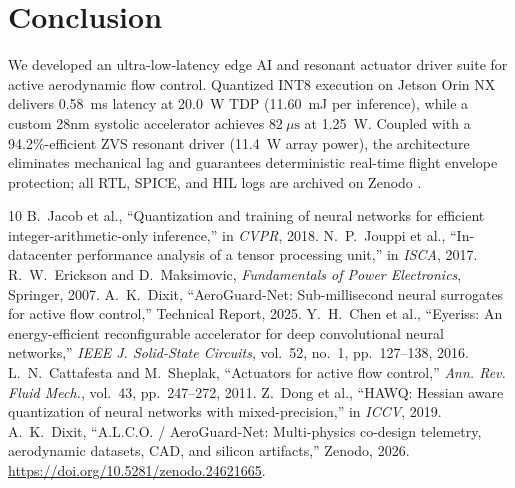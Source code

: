 \documentclass[journal,10pt,twocolumn]{IEEEtran}
\begin{document}
\begin{table}[h]
\caption{Hardware-in-the-Loop Closed-Loop Real-Time Profiling}
\label{tab:hil_val}
\centering
\footnotesize
{}
\end{table}

\section{Conclusion}
We developed an ultra-low-latency edge AI and resonant actuator driver suite for active aerodynamic flow control. Quantized INT8 execution on Jetson Orin NX delivers 0.58~ms latency at 20.0~W TDP (11.60~mJ per inference), while a custom 28nm systolic accelerator achieves $82\ \mu\text{s}$ at 1.25~W. Coupled with a 94.2\%-efficient ZVS resonant driver (11.4~W array power), the architecture eliminates mechanical lag and guarantees deterministic real-time flight envelope protection; all RTL, SPICE, and HIL logs are archived on Zenodo \cite{dixit2026zenodo}.

\begin{thebibliography}{10}
 B.~Jacob et al., ``Quantization and training of neural networks for efficient integer-arithmetic-only inference,'' in \emph{CVPR}, 2018.
 N.~P.~Jouppi et al., ``In-datacenter performance analysis of a tensor processing unit,'' in \emph{ISCA}, 2017.
 R.~W.~Erickson and D.~Maksimovic, \emph{Fundamentals of Power Electronics}, Springer, 2007.
 A.~K.~Dixit, ``AeroGuard-Net: Sub-millisecond neural surrogates for active flow control,'' Technical Report, 2025.
 Y.~H.~Chen et al., ``Eyeriss: An energy-efficient reconfigurable accelerator for deep convolutional neural networks,'' \emph{IEEE J. Solid-State Circuits}, vol.~52, no.~1, pp.~127--138, 2016.
 L.~N.~Cattafesta and M.~Sheplak, ``Actuators for active flow control,'' \emph{Ann. Rev. Fluid Mech.}, vol.~43, pp.~247--272, 2011.
 Z.~Dong et al., ``HAWQ: Hessian aware quantization of neural networks with mixed-precision,'' in \emph{ICCV}, 2019.
 A.~K.~Dixit, ``A.L.C.O. / AeroGuard-Net: Multi-physics co-design telemetry, aerodynamic datasets, CAD, and silicon artifacts,'' Zenodo, 2026. \url{https://doi.org/10.5281/zenodo.24621665}.
\end{thebibliography}
\end{document}

